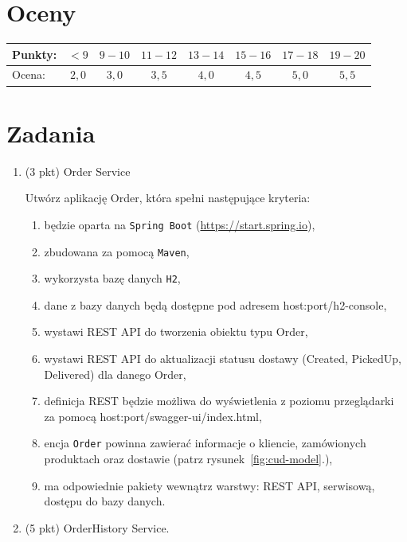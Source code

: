 \documentclass[12pt]{article}
\begin{document}
    \section*{Oceny}
    \begin{tabular}{|l|c|c|c|c|c|c|c|}
        \hline
        Punkty: & $<9$ & $9-10$ & $11-12$ & $13-14$ & $15-16$ & $17-18$ & $19-20$\\
        \hline
        Ocena: & $2,0$ & $3,0$ & $3,5$ & $4,0$ & $4,5$ & $5,0$ & $5,5$\\
        \hline
    \end{tabular}

    \section*{Zadania}
    \begin{enumerate}
        \item\label{exc:order_service}
            (3 pkt) Order Service

            Utwórz aplikację Order, która spełni następujące kryteria:
            \begin{enumerate}
                \item będzie oparta na \texttt{Spring Boot} (\url{https://start.spring.io}),
                \item zbudowana za pomocą \texttt{Maven},
                \item wykorzysta bazę danych \texttt{H2},
                \item dane z bazy danych będą dostępne pod adresem host:port/h2-console,
                \item wystawi REST API do tworzenia obiektu typu Order,
                \item wystawi REST API do aktualizacji statusu dostawy (Created, PickedUp, Delivered) dla danego Order,
                \item definicja REST będzie możliwa do wyświetlenia z poziomu przeglądarki za pomocą host:port/swagger-ui/index.html,
                \item encja \texttt{Order} powinna zawierać informacje o kliencie, zamówionych produktach oraz dostawie (patrz rysunek~\ref{fig:cud-model}.),
                \item ma odpowiednie pakiety wewnątrz warstwy: REST API, serwisową, dostępu do bazy danych.
            \end{enumerate}

        \item\label{exc:order_history_service}
            (5 pkt) OrderHistory Service.


\end{enumerate}
\end{document}
